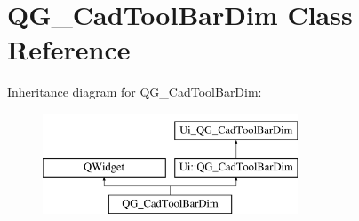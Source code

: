 \hypertarget{classQG__CadToolBarDim}{\section{Q\-G\-\_\-\-Cad\-Tool\-Bar\-Dim Class Reference}
\label{classQG__CadToolBarDim}
}
Inheritance diagram for Q\-G\-\_\-\-Cad\-Tool\-Bar\-Dim\-:\begin{figure}[H]
\begin{center}
\leavevmode
\includegraphics[height=3.000000cm]{classQG__CadToolBarDim}
\end{center}
\end{figure}
